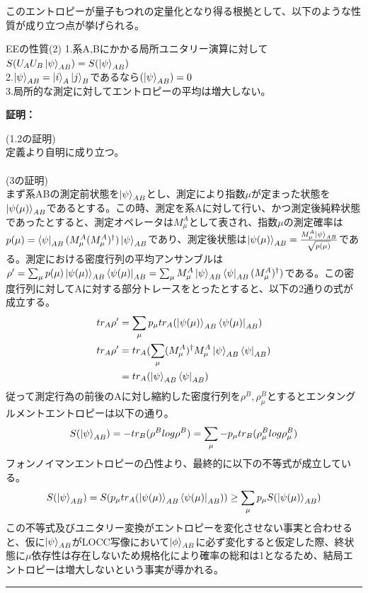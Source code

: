 \documentclass[a4paper,10.5pt]{article}
\numberwithin{equation}{section}
\newenvironment{proofbox}
{\begin{prooflabel}\textbf{証明：}\end{prooflabel}\vspace{0.8em}}
{\par\vspace{1em}\hrule\vspace{1em}}
\begin{document}
このエントロピーが量子もつれの定量化となり得る根拠として、以下のような性質が成り立つ点が挙げられる。
\begin{resultbox}{EEの性質(2)}
1.系A,Bにかかる局所ユニタリー演算に対して$S(U_{A}U_{B}\ket{\psi}_{AB})=S(\ket{\psi}_{AB})$\\
2.$\ket{\psi}_{AB}=\ket{i}_{A}\ket{j}_{B}$であるなら$(\ket{\psi}_{AB})=0$\\
3.局所的な測定に対してエントロピーの平均は増大しない。
\end{resultbox}
\begin{proofbox}
(1.2の証明)\\
定義より自明に成り立つ。\\
\\
(3の証明)\\
まず系ABの測定前状態を$\ket{\psi}_{AB}$とし、測定により指数$\mu$が定まった状態を$\ket{\psi(\mu)}_{AB}$であるとする。この時、測定を系Aに対して行い、かつ測定後純粋状態であったとすると、測定オペレータは$M_{\mu}^{A}$として表され、指数$\mu$の測定確率は$p(\mu)=\bra{\psi}_{AB}(M_{\mu}^{A}(M_{\mu}^{A})^{\dagger})\ket{\psi}_{AB}$であり、測定後状態は$\ket{\psi(\mu)}_{AB}=\frac{M_{\mu}^{A}\ket{\psi}_{AB}}{\sqrt{p(\mu)}}$である。測定における密度行列の平均アンサンブルは$\rho'=\sum_{\mu}p(\mu)\ket{\psi(\mu)}_{AB}\bra{\psi(\mu)}_{AB}=\sum_{\mu}M_{\mu}^{A}\ket{\psi}_{AB}\bra{\psi}_{AB}(M_{\mu}^{A})^{\dagger})$である。この密度行列に対してAに対する部分トレースをとったとすると、以下の2通りの式が成立する。
\begin{equation}\begin{split}
    tr_{A}\rho'&=\sum_{\mu}p_{\mu}tr_{A}(\ket{\psi(\mu)}_{AB}\bra{\psi(\mu)}_{AB})\\
    tr_{A}\rho'&=tr_{A}(\sum_{\mu}(M_{\mu}^{A})^{\dagger}M_{\mu}^{A}\ket{\psi}_{AB}\bra{\psi}_{AB})\\
    &=tr_{A}(\ket{\psi}_{AB}\bra{\psi}_{AB}) 
\end{split} \end{equation}
従って測定行為の前後のAに対し縮約した密度行列を$\rho^{B},\rho_{\mu}^{B}$とするとエンタングルメントエントロピーは以下の通り。
\begin{equation}\begin{split}
    S(\ket{\psi}_{AB}) =-tr_{B}(\rho^{B}log\rho^{B})=\sum_{\mu}-p_{\mu}tr_{B}(\rho_{\mu}^{B}log\rho_{\mu}^{B})
\end{split} \end{equation}
フォンノイマンエントロピーの凸性より、最終的に以下の不等式が成立している。
\begin{equation}\begin{split}
    S(\ket{\psi}_{AB}) =S(p_{\mu}tr_{A}(\ket{\psi(\mu)}_{AB}\bra{\psi(\mu)}_{AB}))\geq \sum_{\mu} p_{\mu}S(\ket{\psi(\mu)}_{AB})
\end{split} \end{equation}
この不等式及びユニタリー変換がエントロピーを変化させない事実と合わせると、仮に$\ket{\psi}_{AB}$がLOCC写像において$\ket{\phi}_{AB}$に必ず変化すると仮定した際、終状態に$\mu$依存性は存在しないため規格化により確率の総和は1となるため、結局エントロピーは増大しないという事実が導かれる。
\end{proofbox}
\end{document}
